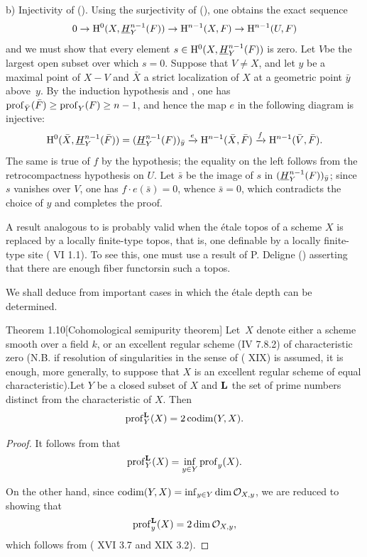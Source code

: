 b) Injectivity of (). Using the surjectivity of (), one obtains the exact sequence
$$0\to \mathrm H^0(X, {\mathop{\underline{H}}\nolimits}_Y^{n-1}(F))\to \mathrm H^{n-1}(X, F)\to \mathrm H^{n-1}(U, F)$$
and we must show that every element $s\in \mathrm H^0(X, {\mathop{\underline{H}}\nolimits}_Y^{n-1}(F))$ is zero. Let $V$\pageoriginale be the largest open subset over which $s=0$. Suppose that $V\neq X$, and let $y$ be a maximal point of $X-V$ and $\bar X$ a strict localization of $X$ at a geometric point $\bar y$ above~$y$. By the induction hypothesis and , one has $\operatorname{prof}_{\bar Y}(\bar F)\geq \operatorname{prof}_Y(F)\geq n-1$, and hence the map $e$ in the following diagram is injective:
$$
\mathrm H^0(\bar X, {\mathop{\underline{H}}\nolimits}_Y^{n-1}(\bar F))= ({\mathop{\underline{H}}\nolimits}_Y^{n-1}(F))_{\bar y}\xrightarrow{e} \mathrm H^{n-1}(\bar X, \bar F) \xrightarrow{f} \mathrm H^{n-1}(\bar V, \bar F).
$$
The same is true of $f$ by the hypothesis; the equality on the left follows from the retrocompactness hypothesis on $U$. Let $\bar s$ be the image of $s$ in $({\mathop{\underline{H}}\nolimits}_Y^{n-1}(F))_{\bar y}$; since $s$ vanishes over $V$, one has $f\cdot e(\bar s)=0$, whence $\bar s=0$, which contradicts the choice of $y$ and completes the proof.

\begin{remarque} \label{XIV.1.9}
A result analogous to  is probably valid when the étale topos of a scheme $X$ is replaced by a \og locally finite-type topos\fg, that is, one definable by a locally finite-type site ( VI 1.1). To see this, one must use a result of P. Deligne (\SGA {}) asserting that there are \og enough fiber functors\fg in such a topos.
\end{remarque}

We shall deduce from  important cases in which the étale depth can be determined.

\label{XIV.1.10}
\begin{enonce*}{Theorem 1.10}[Cohomological semipurity theorem]
Let~$X$ denote either a scheme smooth over a field $k$, or an excellent regular scheme \textup{(\EGA IV 7.8.2)} of characteristic zero (N.B. if resolution of singularities in the sense of \textup{( XIX)} is assumed, it is enough, more generally, to suppose that $X$ is an excellent regular scheme of equal characteristic).\pageoriginaled Let $Y$ be a closed subset of $X$ and $\mathbf L$ the set of prime numbers distinct from the characteristic of $X$. Then
$$
\operatorname{prof}_Y^{\mathbf L}(X)=2\operatorname{codim}(Y, X).
$$
\end{enonce*}

\begin{proof}
It follows from  that
$$
\operatorname{prof}_Y^{\mathbf L}(X)=\inf_{y\in Y} \operatorname{prof}_y(X).
$$

On the other hand, since $\operatorname{codim}(Y, X)=\inf_{y\in Y} \dim \mathcal O_{X, y}$, we are reduced to showing that
$$
\operatorname{prof}_y^{\mathbf L}(X)=2 \dim \mathcal O_{X, y},
$$
which follows from ( XVI 3.7 and XIX 3.2).
\skipqed
\end{proof}

